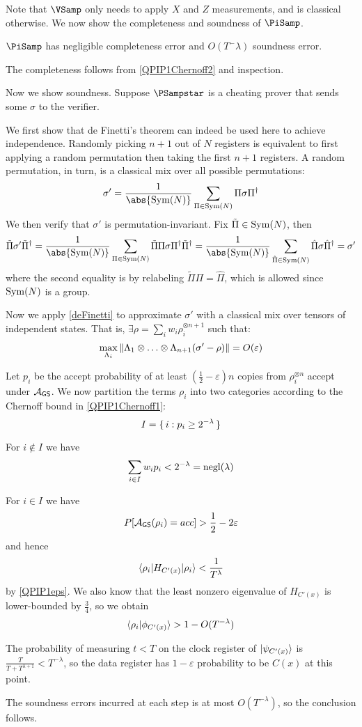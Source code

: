 Note that $\VSamp$ only needs to apply $X$ and $Z$ measurements, and is classical otherwise. We now show the completeness and soundness of $\PiSamp$.

\begin{thm}
    \label{QPIP1thm}
	$\PiSamp$ has negligible completeness error and $O(T^-\lambda)$ soundness error.
\end{thm}
\begin{prf}
	The completeness follows from \cref{QPIP1Chernoff2} and inspection.

	Now we show soundness.
	Suppose $\PSampstar$ is a cheating prover that sends some $\sigma$ to the verifier.

	We first show that de Finetti's theorem can indeed be used here to achieve independence.
	Randomly picking $n+1$ out of $N$ registers is equivalent to first applying a random permutation then taking the first $n+1$ registers.
	A random permutation, in turn, is a classical mix over all possible permutations:
	$$\sigma'=\frac{1}{\abs{\Sym(N)}}\sum_{\Pi\in\Sym(N)}\Pi\sigma\Pi^\dagger$$
	We then verify that $\sigma'$ is permutation-invariant.
	Fix $\tilde{\Pi}\in\operatorname{Sym}(N)$, then
	$$\tilde{\Pi}\sigma'\tilde{\Pi}^\dagger
	=\frac{1}{\abs{\Sym(N)}}\sum_{\Pi\in\Sym(N)}\tilde{\Pi}\Pi\sigma\Pi^\dagger\tilde{\Pi}^\dagger
	=\frac{1}{\abs{\Sym(N)}}\sum_{\hat{\Pi}\in\Sym(N)}\hat{\Pi}\sigma\hat{\Pi}^\dagger
	=\sigma'$$
	where the second equality is by relabeling $\tilde{\Pi}\Pi=\hat{\Pi}$, which is allowed since $\operatorname{Sym}(N)$ is a group.

	Now we apply \cref{deFinetti} to approximate $\sigma'$ with a classical mix over tensors of independent states.
	That is, $\exists\rho=\sum_i w_i\rho_i^{\otimes n+1}$ such that:
	$$\max_{\Lambda_i}\left\lVert\Lambda_1\otimes\ldots\otimes\Lambda_{n+1}(\sigma'-\rho)\right\rVert=O(\varepsilon)$$

	Let $p_i$ be the accept probability of at least $(\frac{1}{2}-\varepsilon)n$ copies from $\rho_i^{\otimes n}$ accept under $\mathcal{A}_{\mathsf{GS}}$.
	We now partition the terms $\rho_i$ into two categories according to the Chernoff bound in \cref{QPIP1Chernoff1}:
	$$I=\set{i:p_i\geq 2^{-\lambda}}$$

	For $i\notin I$ we have
	$$\sum_{i\in I} w_i p_i<2^{-\lambda}=\operatorname{negl}(\lambda)$$

	For $i\in I$ we have
	$$P[\mathcal{A}_{\mathsf{GS}}(\rho_i)=acc]>\frac{1}{2}-2\varepsilon$$
	and hence
	$$\braket{\rho_i|H_{C'(x)}|\rho_i}<\frac{1}{T^\lambda}$$
	by \cref{QPIP1eps}.
	We also know that the least nonzero eigenvalue of $H_{C'(x)}$ is lower-bounded by $\frac{3}{4}$, so we obtain 
	$$\braket{\rho_i|\phi_{C'(x)}}>1-O(T^{-\lambda})$$

	The probability of measuring $t<T$ on the clock register of $\ket{\psi_{C'(x)}}$ is $\frac{T}{T+T^{\lambda+1}}<T^{-\lambda}$,
	so the data register has $1-\varepsilon$ probability to be $C(x)$ at this point.

	The soundness errors incurred at each step is at most $O(T^{-\lambda})$, so the conclusion follows.
\end{prf}

